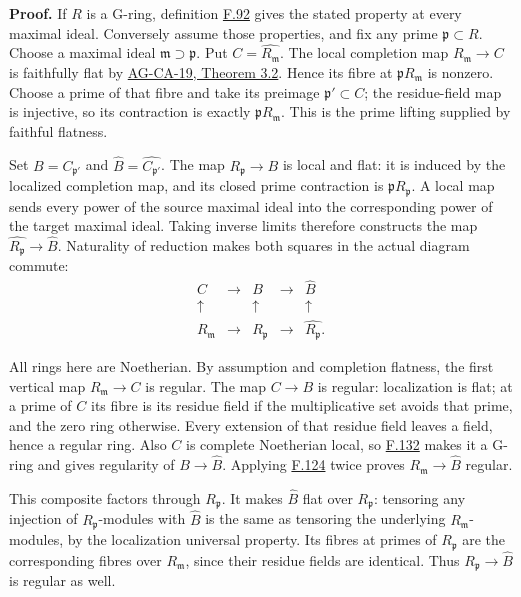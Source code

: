 \documentclass[11pt,a4paper,openany]{report}
\begin{document}
\textbf{Proof.} If \(R\) is a G-ring, definition \hyperref[AG-RG-S05-more-algebra-definition-G-ring]{F.92} gives the stated property at every maximal ideal. Conversely assume those properties, and fix any prime \(\mathfrak p\subset R\). Choose a maximal ideal \(\mathfrak m\supset\mathfrak p\). Put \(C=\widehat{R_{\mathfrak m}}\). The local completion map \(R_{\mathfrak m}\to C\) is faithfully flat by \href{https://github.com/KokunoYumeto/open-math-courses/blob/d02d0a3669f42579db037cd44de1d113fdd770a1/docs/courses/AG-CA/src/completion.md}{AG-CA-19, Theorem 3.2}. Hence its fibre at \(\mathfrak pR_{\mathfrak m}\) is nonzero. Choose a prime of that fibre and take its preimage \(\mathfrak p'\subset C\); the residue-field map is injective, so its contraction is exactly \(\mathfrak pR_{\mathfrak m}\). This is the prime lifting supplied by faithful flatness.

Set \(B=C_{\mathfrak p'}\) and \(\widehat B=\widehat{C_{\mathfrak p'}}\). The map \(R_{\mathfrak p}\to B\) is local and flat: it is induced by the localized completion map, and its closed prime contraction is \(\mathfrak pR_{\mathfrak p}\). A local map sends every power of the source maximal ideal into the corresponding power of the target maximal ideal. Taking inverse limits therefore constructs the map \(\widehat{R_{\mathfrak p}}\to\widehat B\). Naturality of reduction makes both squares in the actual diagram commute: \[\begin{array}{ccccc}
C&\longrightarrow&B&\longrightarrow&\widehat B\\
\uparrow&&\uparrow&&\uparrow\\
R_{\mathfrak m}&\longrightarrow&R_{\mathfrak p}&\longrightarrow&\widehat{R_{\mathfrak p}}.
\end{array}\]

All rings here are Noetherian. By assumption and completion flatness, the first vertical map \(R_{\mathfrak m}\to C\) is regular. The map \(C\to B\) is regular: localization is flat; at a prime of \(C\) its fibre is its residue field if the multiplicative set avoids that prime, and the zero ring otherwise. Every extension of that residue field leaves a field, hence a regular ring. Also \(C\) is complete Noetherian local, so \hyperref[AG-RG-S05-more-algebra-proposition-Noetherian-complete-G-ring]{F.132} makes it a G-ring and gives regularity of \(B\to\widehat B\). Applying \hyperref[AG-RG-S05-more-algebra-lemma-regular-composition]{F.124} twice proves \(R_{\mathfrak m}\to\widehat B\) regular.

This composite factors through \(R_{\mathfrak p}\). It makes \(\widehat B\) flat over \(R_{\mathfrak p}\): tensoring any injection of \(R_{\mathfrak p}\)-modules with \(\widehat B\) is the same as tensoring the underlying \(R_{\mathfrak m}\)-modules, by the localization universal property. Its fibres at primes of \(R_{\mathfrak p}\) are the corresponding fibres over \(R_{\mathfrak m}\), since their residue fields are identical. Thus \(R_{\mathfrak p}\to\widehat B\) is regular as well.
\end{document}
